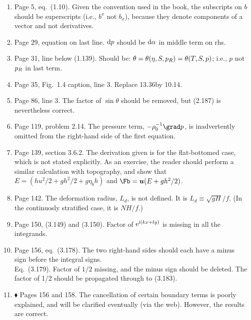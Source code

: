 \documentclass[10pt]{article}
\newcommand{\eq}{eq.\ } \newcommand{\Eq}{Eq.\ }
\renewcommand{\star}{\ensuremath{\blacklozenge} }
\begin{document}
\begin{enumerate}

\item Page 5, \eq (1.10).  Given the  convention used in the book, the subscripts on $b$ should be superscripts (i.e., $b^x$ not $b_x$), because they denote components of a vector and not derivatives. 

\item Page 29, equation on last line. $\mathrm{d} p$ should be $\mathrm{d} \alpha$ in middle term on rhs.

\item Page 31, line below (1.139). Should be: $\theta = \theta(\eta, S, p_{R}) = \theta (T, S, p)$; i.e., $p$ not $p_{R}$ in last term.

\item Page 35, Fig.\ 1.4 caption, line 3. Replace 13.36\dgc by 10.14\dgc. 

\item Page 86, line 3. The factor of $\sin \theta$ should be removed, but (2.187) is nevertheless correct.

\item Page 119, problem 2.14. The pressure term, $-\ro^{-1} \grad p$, is inadvertently omitted from the right-hand side of the first equation. 

\item Page 139, section 3.6.2. The derivation given is for the flat-bottomed case, which is not stated explicitly. As an exercise, the reader should perform a similar calculation with topography, and show that $E = (h u^2/2 + g h^2/2 + g \eta_b h)$ and $\Fb = \ub( E + g h^2/2)$.  

\item Page 142. The deformation radius, $L_d$, is not defined. It is $L_d \equiv \sqrt{gH}/f$. (In the continuosly stratified case, it is $NH/f$.)

\item Page 150, (3.149) and (3.150). Factor of $\mathrm{e}^{\mathrm{i} (kx + ly)}$ is missing in all the integrands. 

\item Page 156, \eq (3.178). The two right-hand sides should each have a minus sign before the integral signs. \\
\Eq (3.179). Factor of $1/2$ missing, and the minus sign should be deleted. The factor of 1/2 should be propagated through to (3.183). 

\item \star \label{cancel} Pages 156 and 158. The cancellation of certain boundary terms is poorly explained, and will be clarified eventually (via the web). However, the results are correct.  


\end{enumerate}
\end{document}
